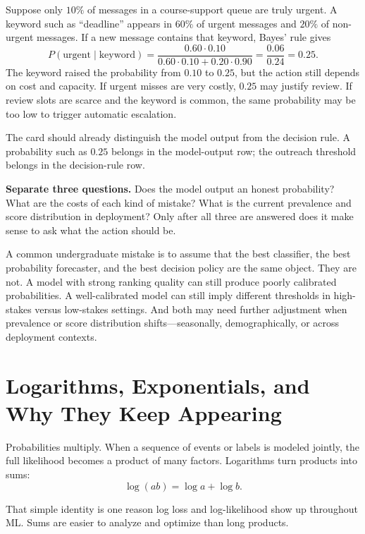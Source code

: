\begin{example}
Suppose only \(10\%\) of messages in a course-support queue are truly urgent. A keyword such as ``deadline'' appears in \(60\%\) of urgent messages and \(20\%\) of non-urgent messages. If a new message contains that keyword, Bayes' rule gives
\[
P(\text{urgent}\mid\text{keyword}) =
\frac{0.60 \cdot 0.10}{0.60 \cdot 0.10 + 0.20 \cdot 0.90}
= \frac{0.06}{0.24}=0.25.
\]
The keyword raised the probability from \(0.10\) to \(0.25\), but the action still depends on cost and capacity. If urgent misses are very costly, \(0.25\) may justify review. If review slots are scarce and the keyword is common, the same probability may be too low to trigger automatic escalation.
\end{example}

The card should already distinguish the model output from the decision rule. A probability such as \(0.25\) belongs in the model-output row; the outreach threshold belongs in the decision-rule row.

\textbf{Separate three questions.} Does the model output an honest probability? What are the costs of each kind of mistake? What is the current prevalence and score distribution in deployment? Only after all three are answered does it make sense to ask what the action should be.

A common undergraduate mistake is to assume that the best classifier, the best probability forecaster, and the best decision policy are the same object. They are not. A model with strong ranking quality can still produce poorly calibrated probabilities. A well-calibrated model can still imply different thresholds in high-stakes versus low-stakes settings. And both may need further adjustment when prevalence or score distribution shifts---seasonally, demographically, or across deployment contexts.

\section*{Logarithms, Exponentials, and Why They Keep Appearing}

Probabilities multiply. When a sequence of events or labels is modeled jointly, the full likelihood becomes a product of many factors. Logarithms turn products into sums:
\[
\log(ab) = \log a + \log b.
\]

That simple identity is one reason log loss and log-likelihood show up throughout ML. Sums are easier to analyze and optimize than long products.

